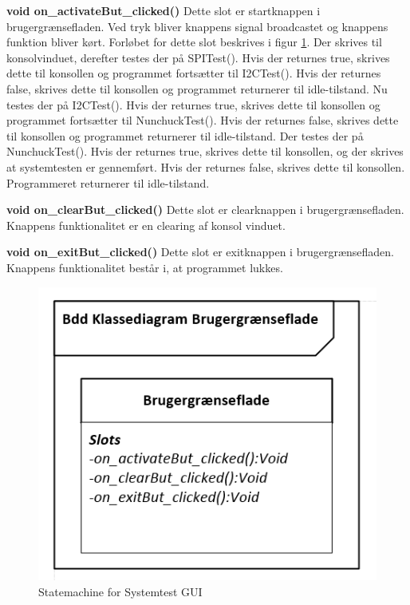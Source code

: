 \noindent\textbf{void on\_activateBut\_clicked()} \newline
Dette slot er startknappen i brugergrænsefladen. Ved tryk bliver knappens signal broadcastet og knappens funktion bliver kørt. Forløbet for dette slot beskrives i figur \ref{fig:stmGUI}. Der skrives til konsolvinduet, derefter testes der på SPITest(). Hvis der returnes true, skrives dette til konsollen og programmet fortsætter til I2CTest(). Hvis der returnes false, skrives dette til konsollen og programmet returnerer til idle-tilstand. Nu testes der på I2CTest(). Hvis der returnes true, skrives dette til konsollen og programmet fortsætter til NunchuckTest(). Hvis der returnes false, skrives dette til konsollen og programmet returnerer til idle-tilstand.
Der testes der på NunchuckTest(). Hvis der returnes true, skrives dette til konsollen, og der skrives at systemtesten er gennemført. Hvis der returnes false, skrives dette til konsollen. Programmeret returnerer til idle-tilstand. \newline

\noindent\textbf{void on\_clearBut\_clicked()} \newline
Dette slot er clearknappen i brugergrænsefladen. Knappens funktionalitet er en clearing af konsol vinduet. \newline

\noindent\textbf{void on\_exitBut\_clicked()} \newline
Dette slot er exitknappen i brugergrænsefladen. Knappens funktionalitet består i, at programmet lukkes.


\begin{figure}[H]
	\centering
	\includegraphics[width=\textwidth]{DesignOgImplementering/images/KlassediagramGUI}
	\caption{Statemachine for Systemtest GUI}
	\label{fig:stmGUI}
\end{figure}



